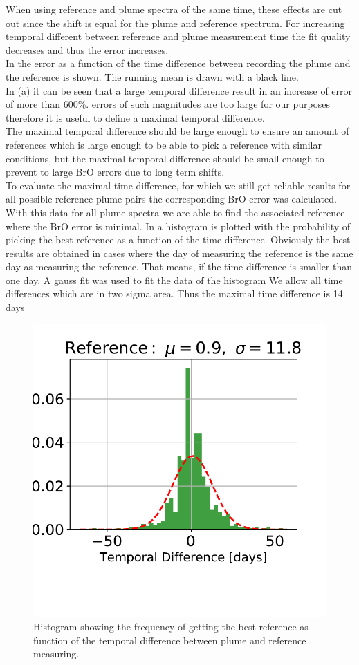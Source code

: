\documentclass  [
  paper    = a4,
  BCOR     = 10mm,
  twoside,
  fontsize = 12pt,
  fleqn,
  toc      = bibnumbered,
  toc      = listofnumbered,
  numbers  = noendperiod,
  headings = normal,
  listof   = leveldown,
  version  = 3.03
]                                       {scrreprt}
\begin{document}
	When using reference and plume spectra of the same time, these effects are cut out since the shift is equal for the plume and reference spectrum. For increasing temporal different between reference and plume measurement time the fit quality decreases and thus the  error increases.\\
	In  the  error as a function of the time difference between recording the plume and the reference is shown. The running mean is drawn with a black line. \\
	In  (a) it can be seen that a large temporal difference result in an increase of  error of more than 600\%.  errors of such magnitudes are too large for our purposes therefore it is useful to define a maximal temporal difference.\\
	The maximal temporal difference should be large enough to ensure an amount of references which is large enough to be able to pick a reference with similar conditions, but the maximal temporal difference should be small enough to prevent to large BrO errors due to long term shifts.\\
	To evaluate the maximal time difference, for which we still get reliable results for all possible reference-plume pairs the corresponding BrO error was calculated. With this data for all plume spectra we are able to find the associated reference where the BrO error is minimal. In  a histogram is plotted with the probability of picking the best reference as a function of the time difference. Obviously the best results are obtained in cases where the day of measuring the reference is the same day as measuring the reference. That means, if the time difference is smaller than one day. A gauss fit was used to fit the data of the histogram We allow all time differences which are in two sigma area. Thus the maximal time difference is 14 days\\
	\begin{figure}
\centering
\includegraphics[width=0.7\linewidth]{Bilder/Hist}
\caption{Histogram showing the frequency of getting the best reference as function of the temporal difference between plume and reference measuring.}
\label{fig:Hist}
\end{figure}
\end{document}
